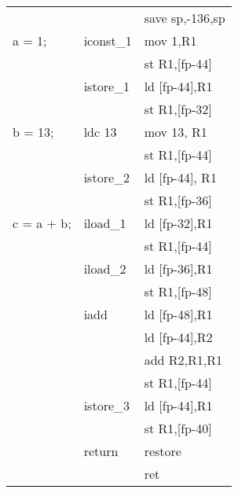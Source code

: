 \begin{slide*}
\begin{center}
\begin{scriptsize}
\begin{tt}
\begin{tabular}{l@{~~~}l@{~~~}l}
        &                    &    save sp,-136,sp\\
a = 1;             &     iconst\_1       &    mov 1,R1\\
                   &                    &    st  R1,[fp-44]\\
                   &     istore\_1       &    ld [fp-44],R1\\
                   &                    &    st R1,[fp-32]\\
b = 13;            &     ldc 13      &    mov 13, R1\\
                   &                    &    st R1,[fp-44]\\
                   &     istore\_2       &    ld [fp-44], R1\\
                   &                     &   st R1,[fp-36]\\
c = a + b;         &     iload\_1        &    ld [fp-32],R1\\
                   &                    &    st R1,[fp-44]\\
                   &     iload\_2        &    ld [fp-36],R1\\
                   &                    &    st R1,[fp-48]\\
                   &     iadd           &    ld [fp-48],R1\\
                   &                    &    ld [fp-44],R2\\
                   &                    &    add R2,R1,R1\\
                   &                    &    st R1,[fp-44]\\
                   &     istore\_3       &    ld [fp-44],R1\\
                   &                    &    st R1,[fp-40]\\
                   &     return         &    restore\\
                   &                    &    ret
\end{tabular}
\end{tt}
\end{scriptsize}
\end{center}
\vfil
\renewcommand{\arraystretch}{1}
\end{slide*}
 
